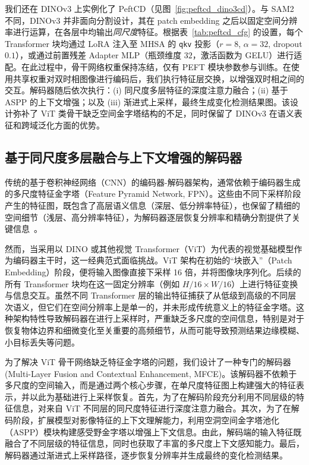 我们还在 DINOv3 上实例化了 PeftCD（见图~\ref{fig:peftcd_dino3cd}）。与 SAM2 不同，DINOv3 并非面向分割设计，其在 patch embedding 之后以固定空间分辨率进行运算，在各层中均输出\emph{同尺度}特征。根据表~\ref{tab:peftcd_cfg} 的设置，每个 Transformer 块均通过 LoRA 注入至 MHSA 的 \texttt{qkv} 投影（$r{=}8$, $\alpha{=}32$, dropout $0.1$），或通过前置残差 Adapter MLP（瓶颈维度 $32$，激活函数为 GELU）进行适配。在此过程中，骨干网络权重保持冻结，仅有 PEFT 模块参数参与训练。在使用共享权重对双时相图像进行编码后，我们执行特征层交换，以增强双时相之间的交互。解码器随后依次执行：(i) 同尺度多层特征的深度注意力融合；(ii) 基于 ASPP 的上下文增强；以及 (iii) 渐进式上采样，最终生成变化检测结果图。该设计弥补了 ViT 类骨干缺乏空间金字塔结构的不足，同时保留了 DINOv3 在语义表征和跨域泛化方面的优势。  



\subsection{基于同尺度多层融合与上下文增强的解码器}

传统的基于卷积神经网络（CNN）的编码器-解码器架构，通常依赖于编码器生成的多尺度特征金字塔（Feature Pyramid Network, FPN）。这些由不同下采样阶段产生的特征图，既包含了高层语义信息（深层、低分辨率特征），也保留了精细的空间细节（浅层、高分辨率特征），为解码器逐层恢复分辨率和精确分割提供了关键信息~\cite{lin_feature_2017}。

然而，当采用以 DINO 或其他视觉 Transformer（ViT）为代表的视觉基础模型作为编码器主干时，这一经典范式面临挑战。ViT 架构在初始的“块嵌入”（Patch Embedding）阶段，便将输入图像直接下采样 16 倍，并将图像块序列化。后续的所有 Transformer 块均在这一固定分辨率（例如 $H/16 \times W/16$）上进行特征变换与信息交互。虽然不同 Transformer 层的输出特征捕获了从低级到高级的不同层次语义，但它们在空间分辨率上是单一的，并未形成传统意义上的特征金字塔。这种架构特性导致解码器在进行上采样时，严重缺乏多尺度的空间信息，特别是对于恢复物体边界和细微变化至关重要的高频细节，从而可能导致预测结果边缘模糊、小目标丢失等问题。

为了解决 ViT 骨干网络缺乏特征金字塔的问题，我们设计了一种专门的解码器(Multi-Layer Fusion and Contextual Enhancement, MFCE)。该解码器不依赖于多尺度的空间输入，而是通过两个核心步骤，在单尺度特征图上构建强大的特征表示，并以此为基础进行上采样恢复。首先，为了在解码阶段充分利用不同层级的特征信息，对来自 ViT 不同层的同尺度特征进行深度注意力融合。其次，为了在解码阶段，扩展模型对影像特征的上下文理解能力，利用空洞空间金字塔池化（ASPP）模块构建感受野金字塔以增强上下文信息。由此，解码端的输入特征既融合了不同层级的特征信息，同时也获取了丰富的多尺度上下文感知能力。最后，解码器通过渐进式上采样路径，逐步恢复分辨率并生成最终的变化检测结果。


